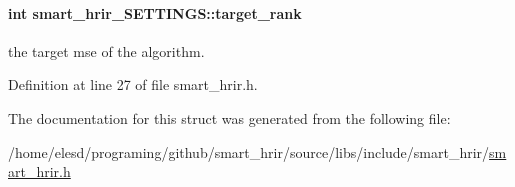 \hypertarget{a00002_a7fe041024e3b80d4432497f6be9c7b8f}{
\paragraph[{target\-\_\-rank}]{\setlength{\rightskip}{0pt plus 5cm}int smart\-\_\-hrir\-\_\-\-S\-E\-T\-T\-I\-N\-G\-S\-::target\-\_\-rank}}\label{a00002_a7fe041024e3b80d4432497f6be9c7b8f}
the target mse of the algorithm. 

Definition at line 27 of file smart\-\_\-hrir.\-h.



The documentation for this struct was generated from the following file\-:\begin{DoxyCompactItemize}
\item 
/home/elesd/programing/github/smart\-\_\-hrir/source/libs/include/smart\-\_\-hrir/\hyperlink{a00006}{smart\-\_\-hrir.\-h}\end{DoxyCompactItemize}
